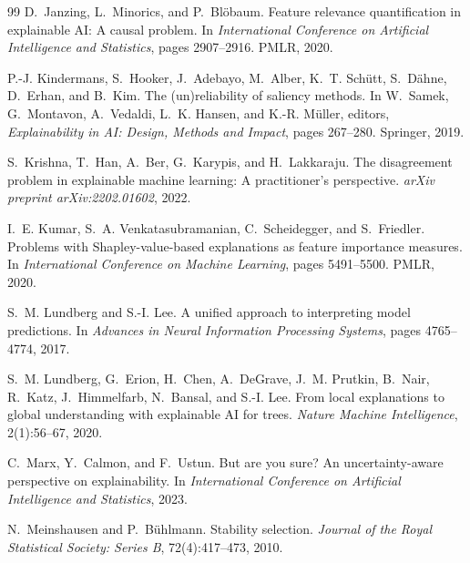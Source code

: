 \documentclass[10pt]{article}
\begin{document}
\begin{thebibliography}{99}
D.~Janzing, L.~Minorics, and P.~Bl{\"o}baum.
\newblock Feature relevance quantification in explainable {AI}: A causal
  problem.
\newblock In \emph{International Conference on Artificial Intelligence and
  Statistics}, pages 2907--2916. PMLR, 2020.

P.-J. Kindermans, S.~Hooker, J.~Adebayo, M.~Alber, K.~T. Sch{\"u}tt,
  S.~D{\"a}hne, D.~Erhan, and B.~Kim.
\newblock The (un)reliability of saliency methods.
\newblock In W.~Samek, G.~Montavon, A.~Vedaldi, L.~K. Hansen, and K.-R.
  M{\"u}ller, editors, \emph{Explainability in AI: Design, Methods and Impact},
  pages 267--280. Springer, 2019.

S.~Krishna, T.~Han, A.~Ber, G.~Karypis, and H.~Lakkaraju.
\newblock The disagreement problem in explainable machine learning: A
  practitioner's perspective.
\newblock \emph{arXiv preprint arXiv:2202.01602}, 2022.

I.~E. Kumar, S.~A. Venkatasubramanian, C.~Scheidegger, and S.~Friedler.
\newblock Problems with {S}hapley-value-based explanations as feature importance
  measures.
\newblock In \emph{International Conference on Machine Learning}, pages
  5491--5500. PMLR, 2020.

S.~M. Lundberg and S.-I. Lee.
\newblock A unified approach to interpreting model predictions.
\newblock In \emph{Advances in Neural Information Processing Systems}, pages
  4765--4774, 2017.

S.~M. Lundberg, G.~Erion, H.~Chen, A.~DeGrave, J.~M. Prutkin, B.~Nair,
  R.~Katz, J.~Himmelfarb, N.~Bansal, and S.-I. Lee.
\newblock From local explanations to global understanding with explainable {AI}
  for trees.
\newblock \emph{Nature Machine Intelligence}, 2(1):56--67, 2020.

C.~Marx, Y.~Calmon, and F.~Ustun.
\newblock But are you sure? An uncertainty-aware perspective on explainability.
\newblock In \emph{International Conference on Artificial Intelligence and
  Statistics}, 2023.

N.~Meinshausen and P.~B{\"u}hlmann.
\newblock Stability selection.
\newblock \emph{Journal of the Royal Statistical Society: Series B},
  72(4):417--473, 2010.


\end{thebibliography}
\end{document}
